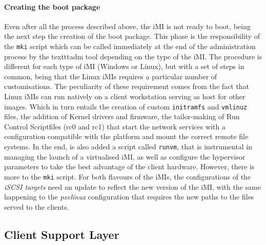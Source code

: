 
\paragraph{Creating the boot package}
\label{par:icbd_create_bootpack}
Even after all the process described above, the iMI is not ready to boot, being the next step the creation of the boot package. This phase is the responsibility of the \texttt{mki} script which can be called immediately at the end of the administration process by the texttt{adm} tool depending on the type of the iMI.
The procedure is different for each type of iMI (Windows or Linux), but with a set of steps in common, being that the Linux iMIs requires a particular number of customisations. The peculiarity of these requirement comes from the fact that Linux iMIs can run natively on a client workstation serving as host for other images. Which in turn entails the creation of custom \texttt{initramfs} and \texttt{vmlinuz} files, the addition of Kernel drivers and firmware, the tailor-making of Run Control Scriptfiles (rc0 and rc1) that start the network services with a configuration compatible with the platform and mount the correct remote file systems. In the end, is also added a script called \texttt{runvm}, that is instrumental in managing the launch of a virtualised iMI, as well as configure the hypervisor parameters to take the best advantage of the client hardware.
However, there is more to the \texttt{mki} script. For both flavours of the iMIs, the configurations of the \textit{iSCSI targets} need an update to reflect the new version of the iMI, with the same happening to the \textit{pxelinux} configuration that requires the new paths to the files served to the clients.


\subsection{Client Support Layer}
\label{sub:icbd_client_support_layer}

